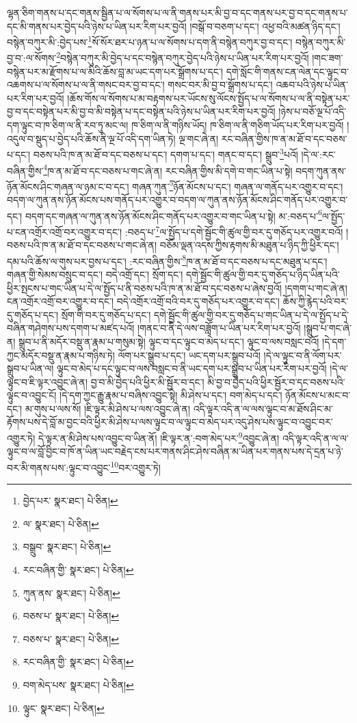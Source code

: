 ལྷན་ཅིག་གནས་པ་དང་གནས་སྦྱིན་པ་ལ་སོགས་པ་ལ་ནི་གནས་པར་མི་བྱ་བ་དང་གནས་པར་བྱ་བ་དང་གནས་པ་དང་མི་གནས་པར་བྱེད་པའི་ཉེས་པ་ཡིན་པར་རིག་པར་བྱའོ། །བསྒོ་བ་བཅག་པ་དང་། འཕྱ་བའི་མཚན་ཉིད་དང་། བསྙེན་བཀུར་མི་:བྱེད་པས་\footnote{བྱེད་པར་  སྣར་ཐང་།  པེ་ཅིན། }སོ་སོར་ཐར་པ་ཉན་པ་ལ་སོགས་པ་དག་ནི་བསྙེན་བཀུར་བྱ་བ་དང་། བསྙེན་བཀུར་མི་བྱ་བ་:ལ་སོགས་\footnote{ལ་  སྣར་ཐང་།  པེ་ཅིན། }བསྙེན་བཀུར་མི་བྱེད་པ་དང་བསྙེན་བཀུར་བྱེད་པའི་ཉེས་པ་ཡིན་པར་རིག་པར་བྱའོ། །གང་ཟག་བསྙེན་པར་མ་རྫོགས་པ་ལ་མིའི་ཆོས་བླ་མ་ཡང་དག་པར་སྒྲོགས་པ་དང་། དགེ་སློང་གི་གནས་ངན་ལེན་དང་ལྟུང་བ་འཆགས་པ་ལ་སོགས་པ་ལ་ནི་གསང་བར་བྱ་བ་དང་། གསང་བར་མི་བྱ་བ་སྒྲོགས་པ་དང་། འཆབ་པའི་ཉེས་པ་ཡིན་པར་རིག་པར་བྱའོ། །ཆོས་གོས་ལ་སོགས་པ་མ་བརྟགས་པར་ཡོངས་སུ་ལོངས་སྤྱོད་པ་ལ་སོགས་པ་ལ་ནི་བསྟེན་པར་བྱ་བ་དང་བསྟེན་པར་མི་བྱ་བ་མི་བསྟེན་པ་དང་བསྟེན་པའི་ཉེས་པ་ཡིན་པར་རིག་པར་བྱའོ། །ཉེས་པ་བཅོ་ལྔ་པོ་འདི་དག་ལྟུང་བ་ཁ་ཅིག་ལ་ནི་རབ་ཏུ་མང་ལ། ཁ་ཅིག་ལ་ནི་གཉིས་ཡོད། ཁ་ཅིག་ལ་ནི་གཅིག་ཡོད་པར་རིག་པར་བྱའོ། །འདུལ་བ་སྡུད་པ་བྱེད་པའི་ཆོས་ནི་ལྔ་པོ་འདི་དག་ཡིན་ཏེ། ལྔ་གང་ཞེ་ན། རང་བཞིན་གྱིས་ཁ་ན་མ་ཐོ་བ་དང་བཅས་པ་དང་། བཅས་པའི་ཁ་ན་མ་ཐོ་བ་དང་བཅས་པ་དང་། དགག་པ་དང་། གནང་བ་དང་། སྒྲུབ་\footnote{བསྒྲུབ་  སྣར་ཐང་།  པེ་ཅིན། }པའོ། །དེ་ལ་:རང་བཞིན་གྱིས་\footnote{རང་བཞིན་གྱི་  སྣར་ཐང་།  པེ་ཅིན། }ཁ་ན་མ་ཐོ་བ་དང་བཅས་པ་གང་ཞེ་ན། རང་བཞིན་གྱིས་མི་དགེ་བ་གང་ཡིན་པ་སྟེ། བདག་ཀུན་ནས་ཉོན་མོངས་ཤིང་གཞན་ལ་ཉམ་ང་བ་དང་། གཞན་ཀུན་\footnote{ཀུན་ནས་  སྣར་ཐང་།  པེ་ཅིན། }ཉོན་མོངས་པ་དང་། གཞན་ལ་གནོད་པར་འགྱུར་བ་དང་། བདག་ལ་ཀུན་ནས་ཉོན་མོངས་པས་གནོད་པར་འགྱུར་བ་བདག་ལ་ཀུན་ནས་ཉོན་མོངས་ཤིང་གནོད་པར་འགྱུར་བ་དང་། བདག་དང་གཞན་ལ་ཀུན་ནས་ཉོན་མོངས་ཤིང་གནོད་པར་འགྱུར་བ་གང་ཡིན་པ་སྟེ། མ་:བཅད་པ་\footnote{བཅས་པ་  སྣར་ཐང་།  པེ་ཅིན། }ལ་སྤྱོད་པ་ངན་འགྲོར་འགྲོ་བར་འགྱུར་བ་དང་། :བཅད་པ་\footnote{བཅས་པ་  སྣར་ཐང་།  པེ་ཅིན། }ལ་སྤྱོད་པ་དགེ་སྦྱོང་གི་ཚུལ་གྱི་བར་དུ་གཅོད་པར་འགྱུར་བའོ། །བཅས་པའི་ཁ་ན་མ་ཐོ་བ་དང་བཅས་པ་གང་ཞེ་ན། བཅོམ་ལྡན་འདས་ཀྱིས་རྟགས་མི་མཐུན་པ་ཉིད་ཀྱི་ཕྱིར་དང་། དམ་པའི་ཆོས་ལ་གུས་པར་བྱས་པ་དང་། :རང་བཞིན་གྱིས་\footnote{རང་བཞིན་གྱི་  སྣར་ཐང་།  པེ་ཅིན། }ཁ་ན་མ་ཐོ་བ་དང་བཅས་པ་དང་མཐུན་པ་དང་། གཞན་གྱི་སེམས་བསྲུང་བ་དང་། བདེ་འགྲོ་དང་། སྲོག་དང་། དགེ་སྦྱོང་གི་ཚུལ་གྱི་བར་དུ་གཅོད་པ་ཉིད་ཡིན་པའི་ཕྱིར་སྤངས་པ་གང་ཡིན་པ་དེ་ལ་སྤྱོད་པ་ནི་བཅས་པའི་ཁ་ན་མ་ཐོ་བ་དང་བཅས་པ་ཞེས་བྱའོ། །དགག་པ་གང་ཞེ་ན། ངན་འགྲོར་འགྲོ་བར་འགྱུར་བ་དང་། བདེ་འགྲོར་འགྲོ་བའི་བར་དུ་གཅོད་པར་འགྱུར་བ་དང་། ཆོས་ཀྱི་རྙེད་པའི་བར་དུ་གཅོད་པ་དང་། སྲོག་གི་བར་དུ་གཅོད་པ་དང་། དགེ་སྦྱོང་གི་ཚུལ་གྱི་བར་དུ་གཅོད་པ་གང་ཡིན་པ་དེ་ལ་སྤྱོད་པ་དེ་བཞིན་གཤེགས་པས་དགག་པ་མཛད་པའོ། །གནང་བ་ནི་དེ་ལས་བཟློག་པ་ཡིན་པར་རིག་པར་བྱའོ། །སྒྲུབ་པ་གང་ཞེ་ན། སྒྲུབ་པ་ནི་མདོར་བསྡུ་ན་རྣམ་པ་གསུམ་སྟེ། ལྟུང་བ་དང་ལྟུང་བ་མེད་པ་དང་། ལྟུང་བ་ལས་བསླང་བའོ། །དེ་དག་ཀྱང་མདོར་བསྡུ་ན་རྣམ་པ་གཉིས་ཏེ། ལོག་པར་སྒྲུབ་པ་དང་། ཡང་དག་པར་སྒྲུབ་པའོ། །དེ་ལ་ལྟུང་བ་ནི་ལོག་པར་སྒྲུབ་པ་ཡིན་ལ། ལྟུང་བ་མེད་པ་དང་ལྟུང་བ་ལས་བསླང་བ་ནི་ཡང་དག་པར་སྒྲུབ་པ་ཡིན་པར་རིག་པར་བྱའོ། །དེ་ལ་ལྟུང་བ་ཇི་ལྟར་འབྱུང་ཞེ་ན། བྱ་བ་མི་བྱེད་པའི་ཕྱིར་མི་སྦྱོར་བ་དང་། མི་བྱ་བ་བྱེད་པའི་ཕྱིར་སྦྱོར་བ་དང་བཅས་པའི་ལྟུང་བ་འབྱུང་ངོ། །དེ་དག་ཀྱང་རྒྱུ་རྣམ་པ་བཞིས་འབྱུང་སྟེ། མི་ཤེས་པ་དང་། བག་མེད་པ་དང་། ཉོན་མོངས་པ་མང་བ་དང་། མ་གུས་པ་ལས་སོ། །ཇི་ལྟར་མི་ཤེས་པ་ལས་འབྱུང་ཞེ་ན། འདི་ལྟར་འདི་ན་ལ་ལས་ལྟུང་བ་མ་ཐོས་ཤིང་མ་རྟོགས་པས་དེ་བློ་མ་བྱང་བའི་ཕྱིར་མི་ཤེས་པ་ལས་ལྟུང་བ་ལ་ལྟུང་བ་མེད་པར་འདུ་ཤེས་པས་ལྟུང་བ་འབྱུང་བར་འགྱུར་ཏེ། དེ་ལྟར་ན་མི་ཤེས་པས་འབྱུང་བ་ཡིན་ནོ། །ཇི་ལྟར་ན་:བག་མེད་པར་\footnote{བག་མེད་པས་  སྣར་ཐང་།  པེ་ཅིན། }འབྱུང་ཞེ་ན། འདི་ལྟར་འདི་ན་ལ་ལ་ལྟུང་བ་ལ་བློ་བྱིང་བ་ཁོ་ན་ཡིན་ཡང་བརྗེད་ངས་པར་གནས་ཤིང་ཤེས་བཞིན་མ་ཡིན་པར་གནས་པས་དེ་དྲན་པ་ཉེ་བར་མི་གནས་པས་:ལྟུང་བ་འབྱུང་\footnote{ལྟུང་  སྣར་ཐང་།  པེ་ཅིན། }བར་འགྱུར་ཏེ། 